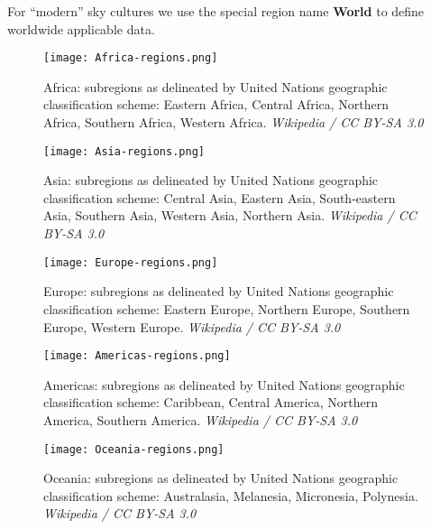 \noindent For ``modern'' sky cultures we use the special region name \textbf{World} to define worldwide applicable data.

\begin{figure}[htbp]
	\centering\texttt{[image: Africa-regions.png]}
	\caption{Africa: subregions as delineated by United Nations geographic classification scheme:
           Eastern Africa,  Central Africa,  Northern Africa,
           Southern Africa,  Western Africa. \emph{Wikipedia / CC BY-SA 3.0}}
	\label{fig:skycultures:AfricaRegions}
\end{figure}

\begin{figure}[htbp]
	\centering\texttt{[image: Asia-regions.png]}
	\caption{Asia: subregions as delineated by United Nations geographic classification scheme:  Central Asia,
           Eastern Asia,  South-eastern Asia,  Southern Asia,
           Western Asia,  Northern Asia. \emph{Wikipedia / CC BY-SA 3.0}}
	\label{fig:skycultures:AsiaRegions}
\end{figure}

\begin{figure}[htbp]
	\centering\texttt{[image: Europe-regions.png]}
	\caption{Europe: subregions as delineated by United Nations geographic classification scheme:  Eastern Europe,
           Northern Europe,  Southern Europe,  Western Europe. \emph{Wikipedia / CC BY-SA 3.0}}
	\label{fig:skycultures:EuropeRegions}
\end{figure}

\begin{figure}[htbp]
	\centering\texttt{[image: Americas-regions.png]}
	\caption{Americas: subregions as delineated by United Nations geographic classification scheme:  Caribbean,
           Central America,  Northern America,  Southern America. \emph{Wikipedia / CC BY-SA 3.0}}
	\label{fig:skycultures:AmericasRegions}
\end{figure}

\begin{figure}[htbp]
	\centering\texttt{[image: Oceania-regions.png]}
	\caption{Oceania: subregions as delineated by United Nations geographic classification scheme:  Australasia, 
           Melanesia,  Micronesia,  Polynesia. \emph{Wikipedia / CC BY-SA 3.0}}
	\label{fig:skycultures:OceaniaRegions}
\end{figure}



